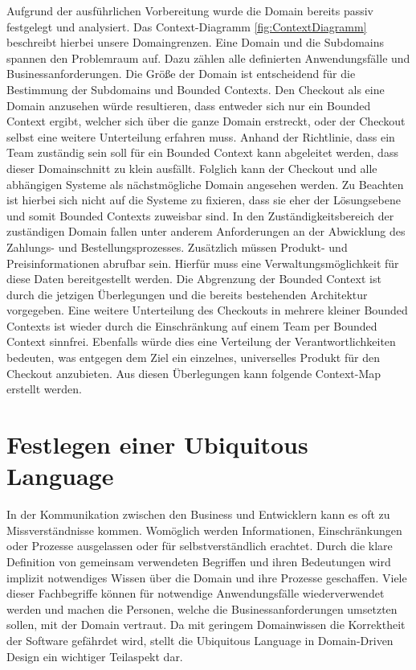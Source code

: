 Aufgrund der ausführlichen Vorbereitung wurde die Domain bereits passiv festgelegt und analysiert. Das Context-Diagramm \ref{fig:ContextDiagramm} beschreibt hierbei unsere Domaingrenzen. Eine Domain und die Subdomains spannen den Problemraum auf. Dazu zählen alle definierten Anwendungsfälle und Businessanforderungen. Die Größe der Domain ist entscheidend für die Bestimmung der Subdomains und Bounded Contexts. Den Checkout als eine Domain anzusehen würde resultieren, dass entweder sich nur ein Bounded Context ergibt, welcher sich über die ganze Domain erstreckt, oder der Checkout selbst eine weitere Unterteilung erfahren muss. Anhand der Richtlinie, dass ein Team zuständig sein soll für ein Bounded Context kann abgeleitet werden, dass dieser Domainschnitt zu klein ausfällt. Folglich kann der Checkout und alle abhängigen Systeme als nächstmögliche Domain angesehen werden. Zu Beachten ist hierbei sich nicht auf die Systeme zu fixieren, dass sie eher der Lösungsebene und somit Bounded Contexts zuweisbar sind. In den Zuständigkeitsbereich der zuständigen Domain fallen unter anderem Anforderungen an der Abwicklung des Zahlungs- und Bestellungsprozesses. Zusätzlich müssen Produkt- und Preisinformationen abrufbar sein. Hierfür muss eine Verwaltungsmöglichkeit für diese Daten bereitgestellt werden. Die Abgrenzung der Bounded Context ist durch die jetzigen Überlegungen und die bereits bestehenden Architektur vorgegeben. Eine weitere Unterteilung des Checkouts in mehrere kleiner Bounded Contexts ist wieder durch die Einschränkung auf einem Team per Bounded Context sinnfrei. Ebenfalls würde dies eine Verteilung der Verantwortlichkeiten bedeuten, was entgegen dem Ziel ein einzelnes, universelles Produkt für den Checkout anzubieten. Aus diesen Überlegungen kann folgende Context-Map erstellt werden.

\section{Festlegen einer Ubiquitous Language}

In der Kommunikation zwischen den Business und Entwicklern kann es oft zu Missverständnisse kommen. Womöglich werden Informationen, Einschränkungen oder Prozesse ausgelassen oder für selbstverständlich erachtet. Durch die klare Definition von gemeinsam verwendeten Begriffen und ihren Bedeutungen wird implizit notwendiges Wissen über die Domain und ihre Prozesse geschaffen. Viele dieser Fachbegriffe können für notwendige Anwendungsfälle wiederverwendet werden und machen die Personen, welche die Businessanforderungen umsetzten sollen, mit der Domain vertraut. Da mit geringem Domainwissen die Korrektheit der Software gefährdet wird, stellt die Ubiquitous Language in Domain-Driven Design ein wichtiger Teilaspekt dar.

